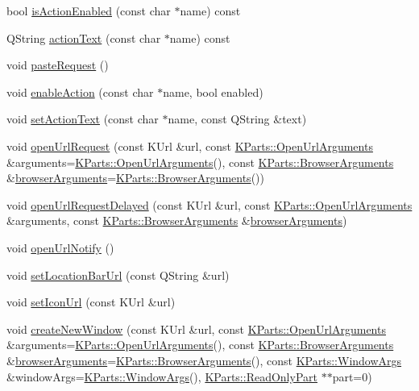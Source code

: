 \begin{DoxyCompactItemize}
\item 
bool \hyperlink{classKParts_1_1BrowserExtension_a28ba7afad45aa10823156627012a8fdb}{is\+Action\+Enabled} (const char $\ast$name) const 
\item 
Q\+String \hyperlink{classKParts_1_1BrowserExtension_a3679c7a2a8b77b9f8afec49393eea1d5}{action\+Text} (const char $\ast$name) const 
\item 
void \hyperlink{classKParts_1_1BrowserExtension_ae6ee41fff23065d6d40e06247feae6e2}{paste\+Request} ()
\item 
void \hyperlink{classKParts_1_1BrowserExtension_a3252f2adebd103519ee15e57037c7386}{enable\+Action} (const char $\ast$name, bool enabled)
\item 
void \hyperlink{classKParts_1_1BrowserExtension_a73506e6a8b89d661512d4a6dfcfaabd5}{set\+Action\+Text} (const char $\ast$name, const Q\+String \&text)
\item 
void \hyperlink{classKParts_1_1BrowserExtension_ac58ebde72bd36f1bfc189ea3ccf05a07}{open\+Url\+Request} (const K\+Url \&url, const \hyperlink{classKParts_1_1OpenUrlArguments}{K\+Parts\+::\+Open\+Url\+Arguments} \&arguments=\hyperlink{classKParts_1_1OpenUrlArguments}{K\+Parts\+::\+Open\+Url\+Arguments}(), const \hyperlink{structKParts_1_1BrowserArguments}{K\+Parts\+::\+Browser\+Arguments} \&\hyperlink{classKParts_1_1BrowserExtension_a8bd50c2c5bd6b43d15c4af157977cc42}{browser\+Arguments}=\hyperlink{structKParts_1_1BrowserArguments}{K\+Parts\+::\+Browser\+Arguments}())
\item 
void \hyperlink{classKParts_1_1BrowserExtension_a8556e230ec679f8b2ddfde63c3039428}{open\+Url\+Request\+Delayed} (const K\+Url \&url, const \hyperlink{classKParts_1_1OpenUrlArguments}{K\+Parts\+::\+Open\+Url\+Arguments} \&arguments, const \hyperlink{structKParts_1_1BrowserArguments}{K\+Parts\+::\+Browser\+Arguments} \&\hyperlink{classKParts_1_1BrowserExtension_a8bd50c2c5bd6b43d15c4af157977cc42}{browser\+Arguments})
\item 
void \hyperlink{classKParts_1_1BrowserExtension_a06b1ae0f0712677310ff7bc0b31b376a}{open\+Url\+Notify} ()
\item 
void \hyperlink{classKParts_1_1BrowserExtension_a335b6f5c78db67e7b8d385eb313b8aef}{set\+Location\+Bar\+Url} (const Q\+String \&url)
\item 
void \hyperlink{classKParts_1_1BrowserExtension_aded24c62c57a7768f54c852831f4fd30}{set\+Icon\+Url} (const K\+Url \&url)
\item 
void \hyperlink{classKParts_1_1BrowserExtension_a99ae7fd5726079c473de103bf3e33833}{create\+New\+Window} (const K\+Url \&url, const \hyperlink{classKParts_1_1OpenUrlArguments}{K\+Parts\+::\+Open\+Url\+Arguments} \&arguments=\hyperlink{classKParts_1_1OpenUrlArguments}{K\+Parts\+::\+Open\+Url\+Arguments}(), const \hyperlink{structKParts_1_1BrowserArguments}{K\+Parts\+::\+Browser\+Arguments} \&\hyperlink{classKParts_1_1BrowserExtension_a8bd50c2c5bd6b43d15c4af157977cc42}{browser\+Arguments}=\hyperlink{structKParts_1_1BrowserArguments}{K\+Parts\+::\+Browser\+Arguments}(), const \hyperlink{classKParts_1_1WindowArgs}{K\+Parts\+::\+Window\+Args} \&window\+Args=\hyperlink{classKParts_1_1WindowArgs}{K\+Parts\+::\+Window\+Args}(), \hyperlink{classKParts_1_1ReadOnlyPart}{K\+Parts\+::\+Read\+Only\+Part} $\ast$$\ast$part=0)
$$
\end{DoxyCompactItemize}
